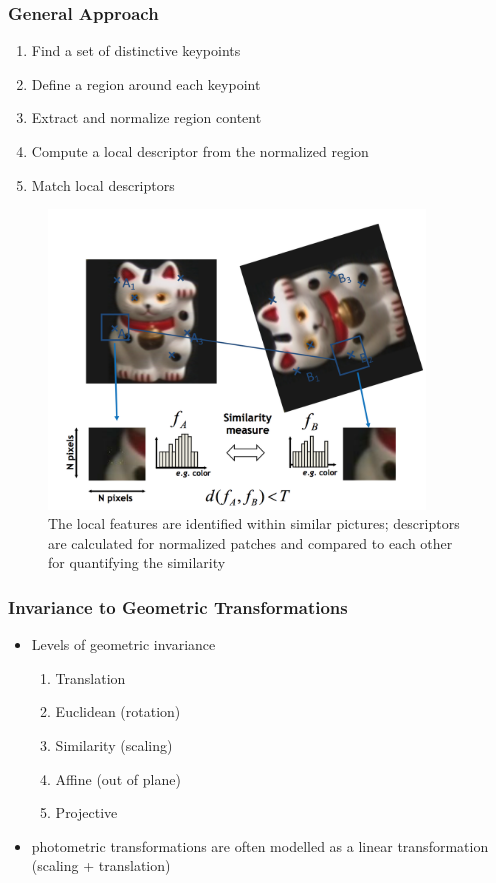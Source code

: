 \documentclass[letterpaper,12pt]{article}
\begin{document}
\subsubsection{General Approach}
\begin{enumerate}
 \item Find a set of distinctive keypoints
 \item Define a region around each keypoint
 \item Extract and normalize region content
 \item Compute a local descriptor from the normalized region
 \item Match local descriptors
\end{enumerate}
\begin{figure}[H]
 \includegraphics[width=10cm]{images/local_feature_ex.png}
 \caption{The local features are identified within similar pictures; descriptors are calculated for normalized patches and compared to each other for quantifying the similarity}
\end{figure}

\subsubsection{Invariance to Geometric Transformations}
\begin{itemize}
 \item Levels of geometric invariance
       \begin{enumerate}
        \item Translation
        \item Euclidean (rotation)
        \item Similarity (scaling)
        \item Affine (out of plane)
        \item Projective
       \end{enumerate}
 \item photometric transformations are often modelled as a linear transformation (scaling + translation)
\end{itemize}
\end{document}
